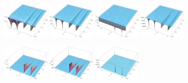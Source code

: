 \begin{figure}[h!]
\center
\begin{minipage}{1.22\textwidth}
\begin{flushleft}
\includegraphics[width=0.20\textwidth,height=0.15\textwidth]{a3fidm0}
\includegraphics[width=0.20\textwidth,height=0.15\textwidth]{a3fidm1}
\includegraphics[width=0.20\textwidth,height=0.15\textwidth]{a3fids0}
\includegraphics[width=0.20\textwidth,height=0.15\textwidth]{a3fids1}
\end{flushleft}
\end{minipage}
\begin{minipage}{1.22\textwidth}
\begin{flushleft}
\includegraphics[width=0.20\textwidth,height=0.15\textwidth]{a3uhlm0}
\includegraphics[width=0.20\textwidth,height=0.15\textwidth]{a3uhlm1}
\includegraphics[width=0.20\textwidth,height=0.15\textwidth]{a3uhls0}

\end{flushleft}
\end{minipage}
\end{figure}

